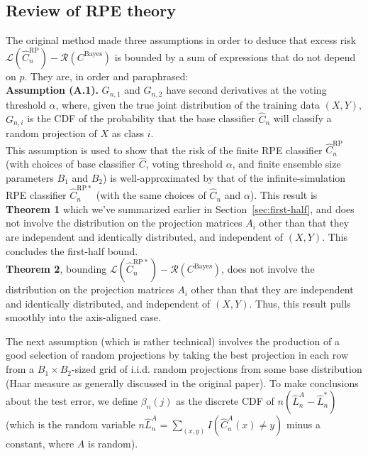 \documentclass{amsart}
\newcommand\cbayes{C^{\mathrm{Bayes}}}
\newcommand\crpnhat{\hat{C}_{n}^{\mathrm{RP}}}
\newcommand\crpnhatstar{\hat{C}_{n}^{\mathrm{RP*}}}
\newcommand\risk{\mathcal{L}}
\newcommand\rrisk{\mathcal{R}}
\begin{document}
\subsection{Review of RPE theory}\label{sec:review}

The original method made three assumptions in order to deduce that
excess risk $\risk(\crpnhat)-\rrisk(\cbayes)$ is bounded by a sum
of expressions that do not depend on $p$. They are, in order and
paraphrased:\\


\noindent \textbf{Assumption (A.1).} $G_{n,1}$ and $G_{n,2}$ have
second derivatives at the voting threshold $\alpha$, where, given
the true joint distribution of the training data $(X,Y)$, $G_{n,i}$
is the CDF of the probability that the base classifier $\hat{C}_{n}$
will classify a random projection of $X$ as class $i$.\\


This assumption is used to show that the risk of the finite
RPE classifier $\crpnhat$ (with choices of base classifier $\hat{C}$,
voting threshold $\alpha$, and finite ensemble size parameters $B_{1}$
and $B_{2}$) is well-approximated by that of the infinite-simulation
RPE classifier $\crpnhatstar$ (with the same choices of $\hat{C}_{n}$
and $\alpha$). This result is \textbf{Theorem 1} which we've summarized
earlier in Section~\ref{sec:first-half}, and does not involve
the distribution on the projection matrices $A_{i}$ other than that
they are independent and identically distributed, and independent
of $(X,Y)$. This concludes the first-half bound.\\


\textbf{Theorem 2}, bounding $\risk(\crpnhatstar)-\rrisk(\cbayes)$,
does not involve the distribution on the projection matrices $A_{i}$
other than that they are independent and identically distributed,
and independent of $(X,Y)$. Thus, this result pulls smoothly into
the axis-aligned case.

\vspace{6pt}

The next assumption (which is rather technical) involves the production of a good selection of random projections by taking the best projection in each row from a $B_{1}\times B_{2}$-sized grid of i.i.d. random projections from some base distribution (Haar measure as generally discussed in the original paper). To make conclusions about the test error, we define $\beta_{n}(j)$ as the discrete CDF of $n\left(\hat{L}_{n}^{A}-\hat{L}_{n}^{*}\right)$ (which is the random variable $n\hat{L}_{n}^{A}=\sum_{(x,y)}I(\hat{C}_{n}^{A}(x)\neq y)$ minus a constant, where $A$ is random).
\end{document}

